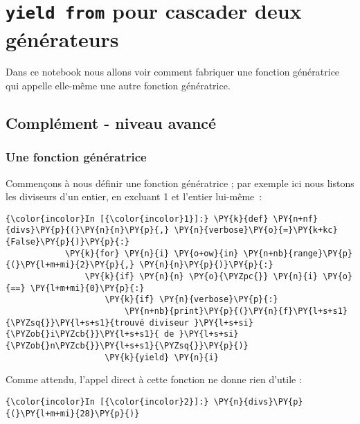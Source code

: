     \hypertarget{yield-from-pour-cascader-deux-guxe9nuxe9rateurs}{%
\section{\texorpdfstring{\texttt{yield\ from} pour cascader deux
générateurs}{yield from pour cascader deux générateurs}}\label{yield-from-pour-cascader-deux-guxe9nuxe9rateurs}}

    Dans ce notebook nous allons voir comment fabriquer une fonction
génératrice qui appelle elle-même une autre fonction génératrice.

    \hypertarget{compluxe9ment---niveau-avancuxe9}{%
\subsection{Complément - niveau
avancé}\label{compluxe9ment---niveau-avancuxe9}}

    \hypertarget{une-fonction-guxe9nuxe9ratrice}{%
\subsubsection{Une fonction
génératrice}\label{une-fonction-guxe9nuxe9ratrice}}

    Commençons à nous définir une fonction génératrice ; par exemple ici
nous listons les diviseurs d'un entier, en excluant 1 et l'entier
lui-même~:

    \begin{Verbatim}[commandchars=\\\{\}]
{\color{incolor}In [{\color{incolor}1}]:} \PY{k}{def} \PY{n+nf}{divs}\PY{p}{(}\PY{n}{n}\PY{p}{,} \PY{n}{verbose}\PY{o}{=}\PY{k+kc}{False}\PY{p}{)}\PY{p}{:}
            \PY{k}{for} \PY{n}{i} \PY{o+ow}{in} \PY{n+nb}{range}\PY{p}{(}\PY{l+m+mi}{2}\PY{p}{,} \PY{n}{n}\PY{p}{)}\PY{p}{:}
                \PY{k}{if} \PY{n}{n} \PY{o}{\PYZpc{}} \PY{n}{i} \PY{o}{==} \PY{l+m+mi}{0}\PY{p}{:}
                    \PY{k}{if} \PY{n}{verbose}\PY{p}{:} 
                        \PY{n+nb}{print}\PY{p}{(}\PY{n}{f}\PY{l+s+s1}{\PYZsq{}}\PY{l+s+s1}{trouvé diviseur }\PY{l+s+si}{\PYZob{}i\PYZcb{}}\PY{l+s+s1}{ de }\PY{l+s+si}{\PYZob{}n\PYZcb{}}\PY{l+s+s1}{\PYZsq{}}\PY{p}{)}
                    \PY{k}{yield} \PY{n}{i}
\end{Verbatim}


    Comme attendu, l'appel direct à cette fonction ne donne rien d'utile :

    \begin{Verbatim}[commandchars=\\\{\}]
{\color{incolor}In [{\color{incolor}2}]:} \PY{n}{divs}\PY{p}{(}\PY{l+m+mi}{28}\PY{p}{)}
\end{Verbatim}


